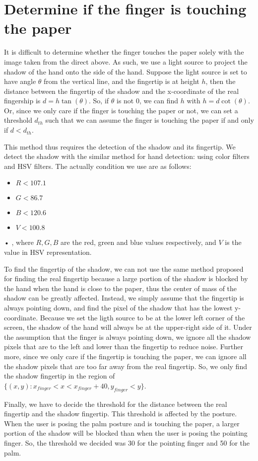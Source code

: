 \section{Determine if the finger is touching the paper}
It is difficult to determine whether the finger touches the paper solely with the image taken from the direct above. As such, we use a light source to project the shadow of the hand onto the side of the hand. Suppose the light source is set to have angle $\theta$ from the vertical line, and the fingertip is at height $h$, then the distance between the fingertip of the shadow and the x-coordinate of the real fingership is $d = h \tan(\theta)$. So, if $\theta$ is not $0$, we can find $h$ with $h = d \cot(\theta)$. Or, since we only care if the finger is touching the paper or not, we can set a threshold $d_{th}$ such that we can assume the finger is touching the paper if and only if $d < d_{th}$. 

This method thus requires the detection of the shadow and its fingertip. We detect the shadow with the similar method for hand detection: using color filters and HSV filters. The actually condition we use are as follows:
\begin{itemize}
\item
$R < 107.1 $\\
\item
$G < 86.7 $\\
\item
$B < 120.6 $\\
\item
$V < 100.8 $\\
\end{itemize}•
, where $R, G, B$ are the red, green and blue values respectively, and $V$ is the value in HSV representation. 

To find the fingertip of the shadow, we can not use the same method proposed for finding the real fingertip because a large portion of the shadow is blocked by the hand when the hand is close to the paper, thus the center of mass of the shadow can be greatly affected.  Instead, we simply assume that the fingertip is always pointing down, and find the pixel of the shadow that has the lowest y-coordinate. Because we set the ligth source to be at the lower left corner of the screen, the shadow of the hand will always be at the upper-right side of it. Under the assumption that the finger is always pointing down, we ignore all the shadow pixels that are to the left and lower than the fingertip to reduce  noise. Further more, since we only care if the fingertip is touching the paper, we can ignore all the shadow pixels that are too far away from the real fingertip. So, we only find the shadow fingertip in the region of $\{(x,y): x_{finger}<x<x_{finger}+40, y_{finger}<y\}$. 

Finally, we have to decide the threshold for the distance between the real fingertip and the shadow fingertip. This threshold is affected by the posture. When the user is posing the palm posture and is touching the paper, a larger portion of the shadow will be blocked than when the user is posing the pointing finger. So, the threshold we decided was 30 for the pointing finger and 50 for the palm. 
